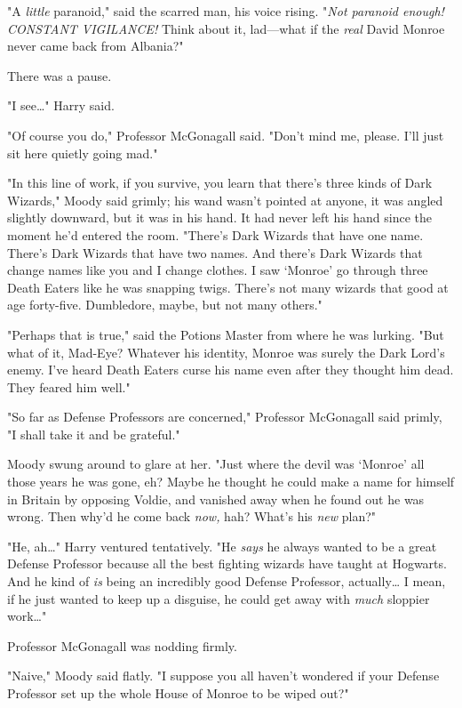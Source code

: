"A \emph{little} paranoid," said the scarred man, his voice rising. "\emph{Not 
paranoid enough! CONSTANT VIGILANCE!} Think about it, lad---what if the 
\emph{real} David Monroe never came back from Albania?"

There was a pause.

"I see{\ldots}" Harry said.

"Of course you do," Professor McGonagall said. "Don't mind me, please. I'll 
just sit here quietly going mad."

"In this line of work, if you survive, you learn that there's three kinds of 
Dark Wizards," Moody said grimly; his wand wasn't pointed at anyone, it was 
angled slightly downward, but it was in his hand. It had never left his hand 
since the moment he'd entered the room. "There's Dark Wizards that have one 
name. There's Dark Wizards that have two names. And there's Dark Wizards that 
change names like you and I change clothes. I saw `Monroe' go through three 
Death Eaters like he was snapping twigs. There's not many wizards that good at 
age forty-five. Dumbledore, maybe, but not many others."

"Perhaps that is true," said the Potions Master from where he was lurking. "But 
what of it, Mad-Eye? Whatever his identity, Monroe was surely the Dark Lord's 
enemy. I've heard Death Eaters curse his name even after they thought him dead. 
They feared him well."

"So far as Defense Professors are concerned," Professor McGonagall said primly, 
"I shall take it and be grateful."

Moody swung around to glare at her. "Just where the devil was `Monroe' all 
those years he was gone, eh? Maybe he thought he could make a name for himself 
in Britain by opposing Voldie, and vanished away when he found out he was 
wrong. Then why'd he come back \emph{now,} hah? What's his \emph{new} plan?"

"He, ah{\ldots}" Harry ventured tentatively. "He \emph{says} he always wanted 
to be a great Defense Professor because all the best fighting wizards have 
taught at Hogwarts. And he kind of \emph{is} being an incredibly good Defense 
Professor, actually{\ldots} I mean, if he just wanted to keep up a disguise, he 
could get away with \emph{much} sloppier work{\ldots}"

Professor McGonagall was nodding firmly.

"Naive," Moody said flatly. "I suppose you all haven't wondered if your Defense 
Professor set up the whole House of Monroe to be wiped out?"

